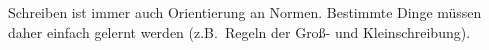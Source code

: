 Schreiben ist immer auch Orientierung an Normen.
Bestimmte Dinge müssen daher einfach gelernt werden (z.B.\ Regeln der Groß- und Kleinschreibung).